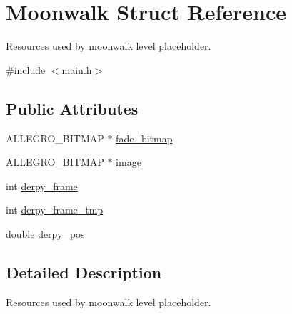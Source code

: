 \hypertarget{structMoonwalk}{\section{\-Moonwalk \-Struct \-Reference}
\label{structMoonwalk}
}


\-Resources used by moonwalk level placeholder.  




{\ttfamily \#include $<$main.\-h$>$}

\subsection*{\-Public \-Attributes}
\begin{DoxyCompactItemize}
\item 
\-A\-L\-L\-E\-G\-R\-O\-\_\-\-B\-I\-T\-M\-A\-P $\ast$ \hyperlink{structMoonwalk_adfea9d8976238abf5d94a797df7ee929}{fade\-\_\-bitmap}
\item 
\-A\-L\-L\-E\-G\-R\-O\-\_\-\-B\-I\-T\-M\-A\-P $\ast$ \hyperlink{structMoonwalk_a99f8ce8d3a4a8c3faca18b7c36eccdca}{image}
\item 
int \hyperlink{structMoonwalk_a4a3874c58e11745d4896b004861e1555}{derpy\-\_\-frame}
\item 
int \hyperlink{structMoonwalk_ab087ba01cd2a107286ec8f75f58c676c}{derpy\-\_\-frame\-\_\-tmp}
\item 
double \hyperlink{structMoonwalk_a69689c77a64928bfb52c1dc1e1f7b33f}{derpy\-\_\-pos}
\end{DoxyCompactItemize}


\subsection{\-Detailed \-Description}
\-Resources used by moonwalk level placeholder. 

